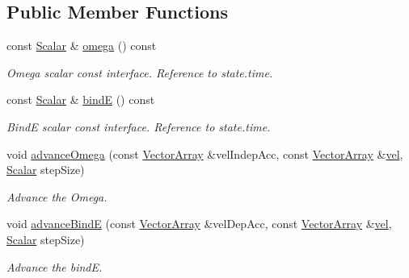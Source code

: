\subsection*{Public Member Functions}
\begin{DoxyCompactItemize}
\item 
const \mbox{\hyperlink{class_vel_indep_particles_a5d275b22f0d759f360ddd80e78f4b466}{Scalar}} \& \mbox{\hyperlink{class_regu_particles_a25cb4d03608826aa5adc943d58cb5b49}{omega}} () const
\begin{DoxyCompactList}\small\item\em Omega scalar const interface. Reference to state.\+time. \end{DoxyCompactList}\item 
const \mbox{\hyperlink{class_vel_indep_particles_a5d275b22f0d759f360ddd80e78f4b466}{Scalar}} \& \mbox{\hyperlink{class_regu_particles_a26a53ea58c9e25c565021b0b1dbde0e7}{bindE}} () const
\begin{DoxyCompactList}\small\item\em BindE scalar const interface. Reference to state.\+time. \end{DoxyCompactList}\item 
void \mbox{\hyperlink{class_regu_particles_a441b0c766baaa1c8861ac778b5702dc7}{advance\+Omega}} (const \mbox{\hyperlink{class_vel_indep_particles_a27580f65b6523bfb6900520af2e44708}{Vector\+Array}} \&vel\+Indep\+Acc, const \mbox{\hyperlink{class_vel_indep_particles_a27580f65b6523bfb6900520af2e44708}{Vector\+Array}} \&\mbox{\hyperlink{class_vel_indep_particles_a5774853214c5f32f34def508962a1267}{vel}}, \mbox{\hyperlink{class_vel_indep_particles_a5d275b22f0d759f360ddd80e78f4b466}{Scalar}} step\+Size)
\begin{DoxyCompactList}\small\item\em Advance the Omega. \end{DoxyCompactList}\item 
void \mbox{\hyperlink{class_regu_particles_a139cfcfd227ca7eb98fa602ff0665607}{advance\+BindE}} (const \mbox{\hyperlink{class_vel_indep_particles_a27580f65b6523bfb6900520af2e44708}{Vector\+Array}} \&vel\+Dep\+Acc, const \mbox{\hyperlink{class_vel_indep_particles_a27580f65b6523bfb6900520af2e44708}{Vector\+Array}} \&\mbox{\hyperlink{class_vel_indep_particles_a5774853214c5f32f34def508962a1267}{vel}}, \mbox{\hyperlink{class_vel_indep_particles_a5d275b22f0d759f360ddd80e78f4b466}{Scalar}} step\+Size)
\begin{DoxyCompactList}\small\item\em Advance the bindE. \end{DoxyCompactList}\end{DoxyCompactItemize}
